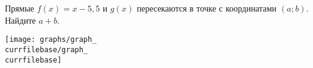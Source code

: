 \begin{ex}
	\begin{condition}
		\begin{minipage}[t]{0.66\textwidth}
			Прямые \( f(x)=x-5,5 \) и \( g(x) \) пересекаются в точке с координатами \( (a;b) \). Найдите \( a+b \).
		\end{minipage}
		\hspace{0.05\textwidth}
		\begin{minipage}[t]{0.22\textwidth}
			\texttt{[image: graphs/graph\_\\currfilebase/graph\_\\currfilebase]}
		\end{minipage}
	\end{condition}
\end{ex}